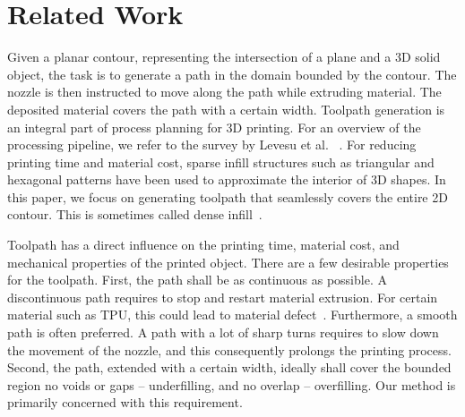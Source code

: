 \section{Related Work}

Given a planar contour, representing the intersection of a plane and a 3D solid object, the task is to generate a path in the domain bounded by the contour.
The nozzle is then instructed to move along the path while extruding material.
The deposited material covers the path with a certain width. Toolpath generation is an integral part of process planning for 3D printing.
For an overview of the processing pipeline, we refer to the survey by Levesu et al.~\cite{Livesu2017CGF} .
For reducing printing time and material cost, sparse infill structures such as triangular and hexagonal patterns have been used to approximate the interior of 3D shapes.
In this paper, we focus on generating toolpath that seamlessly covers the entire 2D contour.
This is sometimes called dense infill~\cite{Livesu2017CGF}.

Toolpath has a direct influence on the printing time, material cost, and mechanical properties of the printed object.
There are a few desirable properties for the toolpath.
First, the path shall be as continuous as possible.
A discontinuous path requires to stop and restart material extrusion. 
For certain material such as TPU, this could lead to material defect~\cite{KUIPERS2019CAD}.
Furthermore, a smooth path is often preferred. A path with a lot of sharp turns requires to slow down the movement of the nozzle, and this consequently prolongs the printing process.
Second, the path, extended with a certain width, ideally shall cover the bounded region no voids or gaps --  underfilling, and no overlap -- overfilling. Our method is primarily concerned with this requirement. 

